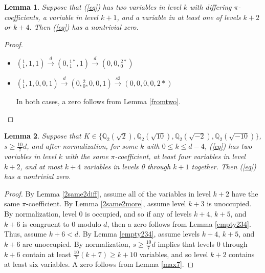 \documentclass[12pt]{amsart}
\newtheorem{lemma}{Lemma}
\begin{document}
\begin{lemma}\label{2diff2more}
Suppose that (\ref{eq}) has two variables in level $k$ with differing $\pi$-coefficients, a variable in level $k+1$, and a variable in at least one of levels $k+2$ or $k+4$.  Then (\ref{eq}) has a nontrivial zero.

\end{lemma}
\begin{proof}~
\begin{itemize}
    \item $({}^{1}_{1}, 1, 1) \xrightarrow{d} (0, {}^{1*}_{1}, 1) \xrightarrow{d} (0, 0, {}^{2*}_{0})$
    \item $({}^{1}_{1}, 1, 0, 0, 1) \xrightarrow{d} (0, {}^{2}_{0}, 0, 0, 1) \xrightarrow{s3} (0, 0, 0, 0, 2*)$
    
In both cases, a zero follows from Lemma \ref{fromtwo}.
\end{itemize}
\end{proof}

\begin{lemma} \label{threeokay}
Suppose that $K \in \{\mathbb{Q}_2(\sqrt{2}), \mathbb{Q}_2(\sqrt{10}), \mathbb{Q}_2(\sqrt{-2}), \mathbb{Q}_2(\sqrt{-10})\}$, $s \ge \frac{10}{7}d$, and after normalization, for some $k$ with $0 \le k \le d-4$, (\ref{eq}) has two variables in level $k$ with the same $\pi$-coefficient, at least four variables in level $k+2$, and at most $k+4$ variables in levels 0 through $k+1$ together.  Then (\ref{eq}) has a nontrivial zero.
\end{lemma}
\begin{proof}
By Lemma \ref{2same2diff}, assume all of the variables in level $k+2$ have the same $\pi$-coefficient.  By Lemma \ref{2same2more}, assume level $k+3$ is unoccupied.  By normalization, level 0 is occupied, and so if any of levels $k+4$, $k+5$, and $k+6$ is congruent to $0$ modulo $d$, then a zero follows from Lemma \ref{empty234}. Thus, assume $k+6 < d$.  By Lemma \ref{empty234}, assume levels $k+4$, $k+5$, and $k+6$ are unoccupied.  By normalization, $s \ge \frac{10}{7}d$ implies that levels 0 through $k+6$ contain at least $\frac{10}{7}(k+7) \ge k+10$ variables, and so level $k+2$ contains at least six variables.  A zero follows from Lemma \ref{max7}.
\end{proof}
\end{document}
